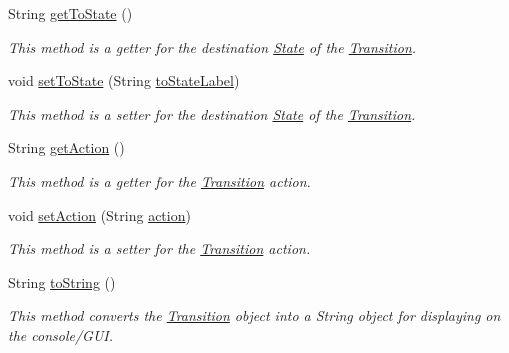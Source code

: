 \begin{DoxyCompactItemize}
String \hyperlink{classese_1_1seas_1_1upenn_1_1edu_1_1_transition_a8adc065ffa3b2d59144f3e1bc5334159}{get\+To\+State} ()
\begin{DoxyCompactList}\small\item\em This method is a getter for the destination \hyperlink{classese_1_1seas_1_1upenn_1_1edu_1_1_state}{State} of the \hyperlink{classese_1_1seas_1_1upenn_1_1edu_1_1_transition}{Transition}. \end{DoxyCompactList}\item 
void \hyperlink{classese_1_1seas_1_1upenn_1_1edu_1_1_transition_a709ce1be87d6954becff885bfea20dea}{set\+To\+State} (String \hyperlink{classese_1_1seas_1_1upenn_1_1edu_1_1_transition_a90ad793f29c7da83bccc4de524b9a28d}{to\+State\+Label})
\begin{DoxyCompactList}\small\item\em This method is a setter for the destination \hyperlink{classese_1_1seas_1_1upenn_1_1edu_1_1_state}{State} of the \hyperlink{classese_1_1seas_1_1upenn_1_1edu_1_1_transition}{Transition}. \end{DoxyCompactList}\item 
String \hyperlink{classese_1_1seas_1_1upenn_1_1edu_1_1_transition_a1cbeb959023673cae243d638c0434844}{get\+Action} ()
\begin{DoxyCompactList}\small\item\em This method is a getter for the \hyperlink{classese_1_1seas_1_1upenn_1_1edu_1_1_transition}{Transition} action. \end{DoxyCompactList}\item 
void \hyperlink{classese_1_1seas_1_1upenn_1_1edu_1_1_transition_aaa5a6e03b91e1a64bc5060e64ef49e5d}{set\+Action} (String \hyperlink{classese_1_1seas_1_1upenn_1_1edu_1_1_transition_a8c04b30e9c745a0d3e0420c3ae80f77a}{action})
\begin{DoxyCompactList}\small\item\em This method is a setter for the \hyperlink{classese_1_1seas_1_1upenn_1_1edu_1_1_transition}{Transition} action. \end{DoxyCompactList}\item 
String \hyperlink{classese_1_1seas_1_1upenn_1_1edu_1_1_transition_ae9e57256dc34d80b35316193f3d4807a}{to\+String} ()
\begin{DoxyCompactList}\small\item\em This method converts the \hyperlink{classese_1_1seas_1_1upenn_1_1edu_1_1_transition}{Transition} object into a String object for displaying on the console/\+G\+U\+I. \end{DoxyCompactList}\item 

\end{DoxyCompactItemize}
